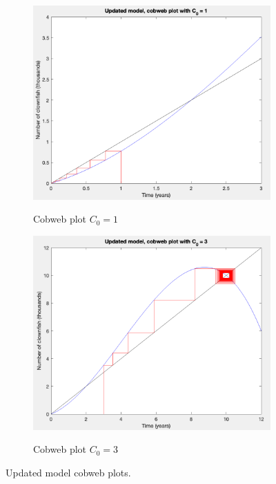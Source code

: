\documentclass[11pt, a4paper]{article}
\begin{document}
\begin{figure}[!h]
    \begin{subfigure}[b]{0.45\textwidth}
      \includegraphics[width=\textwidth]{images/clownfishplot2.png}
      \label{fig:f6}
      \caption{Cobweb plot $C_0 = 1$}
    \end{subfigure}
    \hfill
    \begin{subfigure}[b]{0.45\textwidth}
      \includegraphics[width=\textwidth]{images/clownfishplot3.png}
      \label{fig:f7}
      \caption{Cobweb plot $C_0 = 3$}
    \end{subfigure}
    \caption{Updated model cobweb plots.}
\end{figure}
\end{document}
